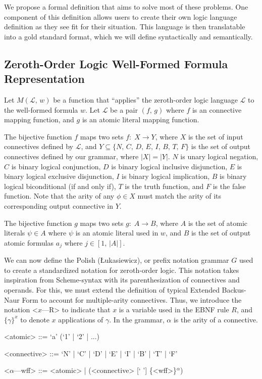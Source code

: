 \documentclass[ms]{uncgdissertationexp2}
\theoremstyle{plain}
\theoremstyle{definition}
\theoremstyle{remark}
\begin{document}
We propose a formal definition that aims to solve most of these problems. One component of this definition allows users to create their own logic language definition as they see fit for their situation. This language is then translatable into a gold standard format, which we will define syntactically and semantically.

\subsection{Zeroth-Order Logic Well-Formed Formula Representation}
Let $M(\mathcal{L},\,w)$ be a function that ``applies'' the zeroth-order logic language $\mathcal{L}$ to the well-formed formula $w$. Let $\mathcal{L}$ be a pair $(f,\,g)$ where $f$ is an connective mapping function, and $g$ is an atomic literal mapping function. 

The bijective function $f$ maps two sets $f:\;X \to Y$, where $X$ is the set of input connectives defined by $\mathcal{L}$, and $Y \subseteq \{N,\,C,\,D,\,E,\,I,\,B,\,T,\,F\}$ is the set of output connectives defined by our grammar, where $|X| = |Y|$. $N$ is unary logical negation, $C$ is binary logical conjunction, $D$ is binary logical inclusive disjunction, $E$ is binary logical exclusive disjunction, $I$ is binary logical implication, $B$ is binary logical biconditional (if and only if), $T$ is the truth function, and $F$ is the false function. Note that the arity of any $\phi \in X$ must match the arity of its corresponding output connective in $Y$.

The bijective function $g$ maps two sets $g:\;A \to B$, where $A$ is the set of atomic literals $\psi \in A$ where $\psi$ is an atomic literal used in $w$, and $B$ is the set of output atomic formulas $a_{j}$ where $j \in [1,\,|A|]$.

We can now define the Polish (Łukasiewicz), or prefix notation grammar $G$ used to create a standardized notation for zeroth-order logic. This notation takes inspiration from Scheme-syntax with its parenthesization of connectives and operands. For this, we must extend the definition of typical Extended Backus-Naur Form to account for multiple-arity connectives. Thus, we introduce the notation \textless{$x$---R\textgreater} to indicate that $x$ is a variable used in the EBNF rule $R$, and $\{\gamma\}^{x}$ to denote $x$ applications of $\gamma$. In the grammar, $\alpha$ is the arity of a connective.
\begin{grammar}
	<atomic> ::= `a' (`1' | `2' | ...)
	        
	<connective> ::= `N' | `C' | `D' | `E' | `I' | `B' | `T' | `F' 
	        
	<$\alpha$---wff> ::= <atomic> | (<connective> [` '] \{<wff>\}$^{\alpha}$)
\end{grammar}
\end{document}
